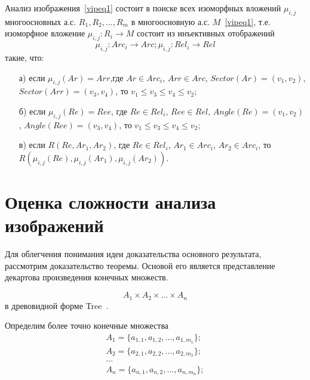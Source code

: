 Анализ изображения~\ref{vipeq1} состоит в поиске всех изоморфных вложений ${ \mu_{i,j} }$ многоосновных а.с. $R_1,R_2,...,R_m$ в многоосновную а.с. $M$~\ref{vipeq1}, т.е.~\cite{6,7} изоморфное вложение $\mu_{i,j} : R_i \rightarrow M$ состоит из инъективных отображений
\begin{equation}
\mu_{i,j} : Arc_i \rightarrow Arc; \mu_{i,j} : Rel_i \rightarrow Rel
\label{vipeq4}
\end{equation}
такие, что:
\begin{enumerate}
\item[а)] если $\mu_{i,j}(Ar) = Arr$,где $Ar \in Arc_i$, $Arr \in Arc$, $Sector(Ar) = (v_1, v_2)$, $Sector(Arr) = (v_3, v_4)$, то $v_1 \le v_3 \le v_4 \le v_2$;
\item[б)] если $\mu_{i,j}(Re) = Ree$, где $Re \in Rel_i$, $Ree \in Rel$, $Angle(Re) = (v_1, v_2)$, $Angle(Ree) = (v_3, v_4)$, то $v_1 \le v_3 \le v_4 \le v_2$;
\item[в)] если $R(Re, Ar_1, Ar_2)$, где $Re \in Rel_i$, $Ar_1 \in Arc_i$, $Ar_2 \in Arc_i$, то $R(\mu_{i,j}(Re), \mu_{i,j}(Ar_1), \mu_{i,j}(Ar_2))$.
\end{enumerate}

\section{Оценка сложности анализа изображений}
Для облегчения понимания идеи доказательства основного результата, рассмотрим доказательство теоремы. Основой его является представление декартова произведения конечных множеств.

$$A_1 \times A_2 \times \ldots \times A_n$$
в древовидной форме Tree~\cite{1}.

Определим более точно конечные множества 
\begin{equation}
\begin{array}{c}
A_1 = \{a_{1,1}, a_{1,2}, ..., a_{1,m_1}\}; \\
A_2 = \{ a_{2,1}, a_{2,2}, ..., a_{2,m_2}\}; \\
\dots \\
A_n = \{ a_{n,1}, a_{n,2}, ..., a_{n,m_n}\}; \\
\end{array}
\end{equation}


